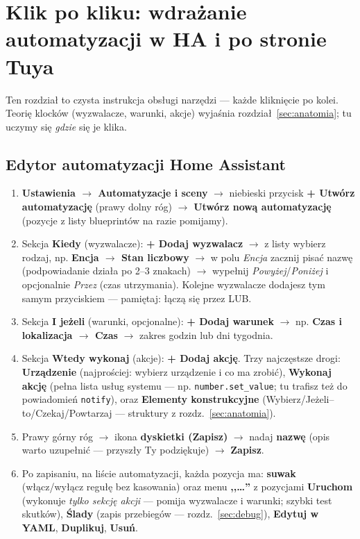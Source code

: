 \documentclass[11pt,a4paper]{article}
\begin{document}
\section{Klik po kliku: wdrażanie automatyzacji w HA i po stronie Tuya}
\label{sec:klik}

Ten rozdział to czysta instrukcja obsługi narzędzi --- każde kliknięcie po kolei. Teorię klocków (wyzwalacze, warunki, akcje) wyjaśnia rozdział~\ref{sec:anatomia}; tu uczymy się \emph{gdzie} się je klika.

\subsection{Edytor automatyzacji Home Assistant}
\label{sec:klik-ha}

\begin{enumerate}
\item \textbf{Ustawienia $\to$ Automatyzacje i sceny} $\to$ niebieski przycisk \textbf{+ Utwórz automatyzację} (prawy dolny róg) $\to$ \textbf{Utwórz nową automatyzację} (pozycje z listy blueprintów na razie pomijamy).
\item Sekcja \textbf{Kiedy} (wyzwalacze): \textbf{+ Dodaj wyzwalacz} $\to$ z listy wybierz rodzaj, np. \textbf{Encja $\to$ Stan liczbowy} $\to$ w polu \emph{Encja} zacznij pisać nazwę (podpowiadanie działa po 2--3 znakach) $\to$ wypełnij \emph{Powyżej}/\emph{Poniżej} i opcjonalnie \emph{Przez} (czas utrzymania). Kolejne wyzwalacze dodajesz tym samym przyciskiem --- pamiętaj: łączą się przez LUB.
\item Sekcja \textbf{I jeżeli} (warunki, opcjonalne): \textbf{+ Dodaj warunek} $\to$ np. \textbf{Czas i lokalizacja $\to$ Czas} $\to$ zakres godzin lub dni tygodnia.
\item Sekcja \textbf{Wtedy wykonaj} (akcje): \textbf{+ Dodaj akcję}. Trzy najczęstsze drogi: \textbf{Urządzenie} (najprościej: wybierz urządzenie i co ma zrobić), \textbf{Wykonaj akcję} (pełna lista usług systemu --- np. \texttt{number.set\_value}; tu trafisz też do powiadomień \texttt{notify}), oraz \textbf{Elementy konstrukcyjne} (Wybierz/Jeżeli--to/Czekaj/Powtarzaj --- struktury z rozdz.~\ref{sec:anatomia}).
\item Prawy górny róg $\to$ ikona \textbf{dyskietki (Zapisz)} $\to$ nadaj \textbf{nazwę} (opis warto uzupełnić --- przyszły Ty podziękuje) $\to$ \textbf{Zapisz}.
\item Po zapisaniu, na liście automatyzacji, każda pozycja ma: \textbf{suwak} (włącz/wyłącz regułę bez kasowania) oraz menu \textbf{,,\ldots''} z pozycjami \textbf{Uruchom} (wykonuje \emph{tylko sekcję akcji} --- pomija wyzwalacze i warunki; szybki test skutków), \textbf{Ślady} (zapis przebiegów --- rozdz.~\ref{sec:debug}), \textbf{Edytuj w YAML}, \textbf{Duplikuj}, \textbf{Usuń}.
\end{enumerate}
\end{document}
